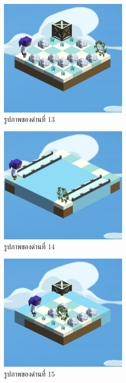 \begin{figure}[H]
    \begin{center}
    \includegraphics[width=2.5in]{pic-toro/stage/s13.png}
    \end{center}
    \caption[รูปภาพของด่านที่ 13]{รูปภาพของด่านที่ 13}
    \label{s13}
\end{figure}
\begin{figure}[H]
    \begin{center}
    \includegraphics[width=2.5in]{pic-toro/stage/s14.png}
    \end{center}
    \caption[รูปภาพของด่านที่ 14]{รูปภาพของด่านที่ 14}
    \label{s14}
\end{figure}
\begin{figure}[H]
    \begin{center}
    \includegraphics[width=2.5in]{pic-toro/stage/s15.png}
    \end{center}
    \caption[รูปภาพของด่านที่ 15]{รูปภาพของด่านที่ 15}
    \label{s15}
\end{figure}

